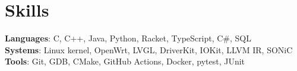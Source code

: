 \documentclass[letterpaper,11pt]{article}
\begin{document}
\section{Skills}
\begin{itemize}[leftmargin=0.15in, label={}]
	\small{\item{
		      \textbf{Languages}{: C, C++, Java, Python, Racket, TypeScript, C\#, SQL} \\
		      \textbf{Systems}{: Linux kernel, OpenWrt, LVGL, DriverKit, IOKit, LLVM IR, SONiC} \\
		      \textbf{Tools}{: Git, GDB, CMake, GitHub Actions, Docker, pytest, JUnit} \\
	      }}
\end{itemize}

\end{document}
